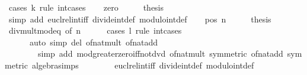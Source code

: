 \begin{isabellebody}
%
\isadelimproof
%
\endisadelimproof
%
\isatagproof
{}\isamarkupfalse%
\ {\isacharparenleft}{\kern0pt}cases\ k\ rule{\isacharcolon}{\kern0pt}\ int{\isacharunderscore}{\kern0pt}cases{}{\isacharparenright}{\kern0pt}\isanewline
\ \ \isamarkupfalse%
\ zero\isanewline
\ \ \isamarkupfalse%
\ \isamarkupfalse%
\ {\isacharquery}{\kern0pt}thesis\isanewline
\ \ \ \ \isamarkupfalse%
\ {\isacharparenleft}{\kern0pt}simp\ add{\isacharcolon}{\kern0pt}\ eucl{\isacharunderscore}{\kern0pt}rel{\isacharunderscore}{\kern0pt}int{\isacharunderscore}{\kern0pt}iff\ divide{\isacharunderscore}{\kern0pt}int{\isacharunderscore}{\kern0pt}def\ modulo{\isacharunderscore}{\kern0pt}int{\isacharunderscore}{\kern0pt}def{\isacharparenright}{\kern0pt}\isanewline
{}\isamarkupfalse%
\isanewline
\ \ \isamarkupfalse%
\ {\isacharparenleft}{\kern0pt}pos\ n{\isacharparenright}{\kern0pt}\isanewline
\ \ \isamarkupfalse%
\ \isamarkupfalse%
\ {\isacharquery}{\kern0pt}thesis\isanewline
\ \ \ \ \isamarkupfalse%
\ div{\isacharunderscore}{\kern0pt}mult{\isacharunderscore}{\kern0pt}mod{\isacharunderscore}{\kern0pt}eq\ {\isacharbrackleft}{\kern0pt}of\ n{\isacharbrackright}{\kern0pt}\isanewline
\ \ \ \ \isamarkupfalse%
\ {\isacharparenleft}{\kern0pt}cases\ l\ rule{\isacharcolon}{\kern0pt}\ int{\isacharunderscore}{\kern0pt}cases{}{\isacharparenright}{\kern0pt}\isanewline
\ \ \ \ \ \ {\isacharparenleft}{\kern0pt}auto\ simp\ del{\isacharcolon}{\kern0pt}\ of{\isacharunderscore}{\kern0pt}nat{\isacharunderscore}{\kern0pt}mult\ of{\isacharunderscore}{\kern0pt}nat{\isacharunderscore}{\kern0pt}add\isanewline
\ \ \ \ \ \ \ \ simp\ add{\isacharcolon}{\kern0pt}\ mod{\isacharunderscore}{\kern0pt}greater{\isacharunderscore}{\kern0pt}zero{\isacharunderscore}{\kern0pt}iff{\isacharunderscore}{\kern0pt}not{\isacharunderscore}{\kern0pt}dvd\ of{\isacharunderscore}{\kern0pt}nat{\isacharunderscore}{\kern0pt}mult\ {\isacharbrackleft}{\kern0pt}symmetric{\isacharbrackright}{\kern0pt}\ of{\isacharunderscore}{\kern0pt}nat{\isacharunderscore}{\kern0pt}add\ {\isacharbrackleft}{\kern0pt}symmetric{\isacharbrackright}{\kern0pt}\ algebra{\isacharunderscore}{\kern0pt}simps\isanewline
\ \ \ \ \ \ \ \ eucl{\isacharunderscore}{\kern0pt}rel{\isacharunderscore}{\kern0pt}int{\isacharunderscore}{\kern0pt}iff\ divide{\isacharunderscore}{\kern0pt}int{\isacharunderscore}{\kern0pt}def\ modulo{\isacharunderscore}{\kern0pt}int{\isacharunderscore}{\kern0pt}def{\isacharparenright}{\kern0pt}\isanewline

\end{isabellebody}
